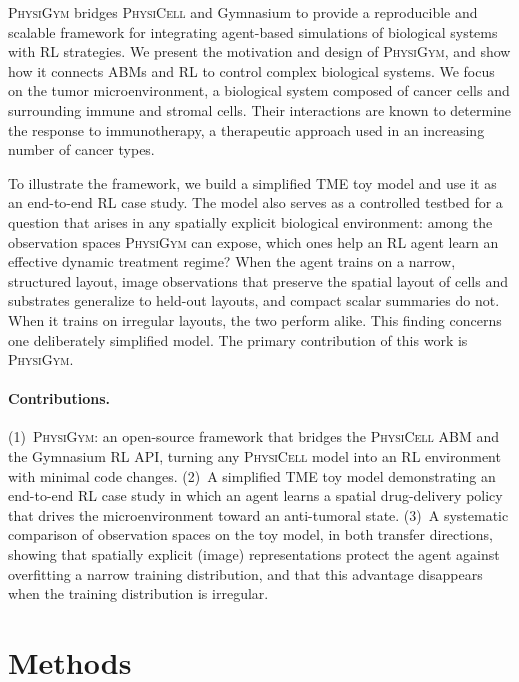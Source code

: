 \documentclass{article}
\newcommand{\physigym}{\textsc{PhysiGym}}
\newcommand{\physicell}{\textsc{PhysiCell}}
\begin{document}
\physigym{} bridges \physicell{} and Gymnasium to provide a reproducible and
scalable framework for integrating agent-based simulations of biological systems
with RL strategies. We present the motivation and design of \physigym{}, and
show how it connects ABMs and RL to control complex biological systems. We focus
on the tumor microenvironment, a biological system composed of cancer cells and
surrounding immune and stromal cells. Their interactions are known to determine
the response to immunotherapy, a therapeutic approach used in an increasing
number of cancer types.

To illustrate the framework, we build a simplified TME toy model and use it as
an end-to-end RL case study. The model also serves as a controlled testbed for
a question that arises in any spatially explicit biological environment: among
the observation spaces \physigym{} can expose, which ones help an RL agent learn
an effective dynamic treatment regime? When the agent trains on a narrow,
structured layout, image observations that preserve the spatial layout of cells
and substrates generalize to held-out layouts, and compact scalar summaries do
not. When it trains on irregular layouts, the two perform alike. This finding
concerns one deliberately simplified model. The primary contribution of this
work is \physigym{}.

\paragraph{Contributions.}
(1)~\physigym{}: an open-source framework that bridges the \physicell{} ABM and
the Gymnasium RL API, turning any \physicell{} model into an RL environment with
minimal code changes.
(2)~A simplified TME toy model demonstrating an end-to-end RL case study in
which an agent learns a spatial drug-delivery policy that drives the
microenvironment toward an anti-tumoral state.
(3)~A systematic comparison of observation spaces on the toy model, in both
transfer directions, showing that spatially explicit (image) representations
protect the agent against overfitting a narrow training distribution, and that
this advantage disappears when the training distribution is irregular.

\section{Methods}
\end{document}
